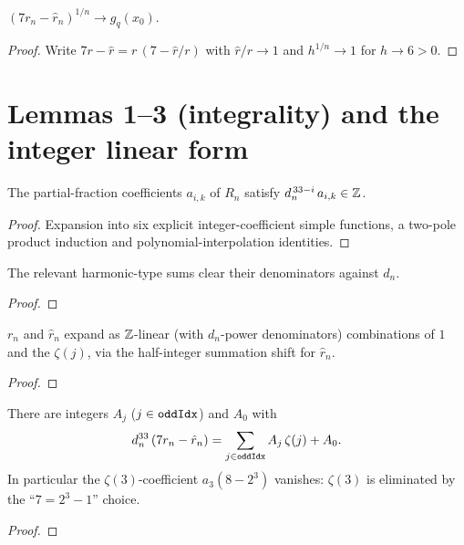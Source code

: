 \begin{lemma}
  \label{lem:seven_root}
  \leanok
  $(7r_n-\hat r_n)^{1/n}\to g_q(x_0)$.
\end{lemma}
\begin{proof}\leanok{}
  Write $7r-\hat r=r\,(7-\hat r/r)$ with $\hat r/r\to1$ and $h^{1/n}\to1$ for
  $h\to6>0$.
\end{proof}

\chapter{Lemmas 1--3 (integrality) and the integer linear form}

\begin{lemma}
  \label{lem:lemma1}
  \leanok
  The partial-fraction coefficients $a_{i,k}$ of $R_n$ satisfy
  $d_n^{\,33-i}\,a_{i,k}\in\mathbb{Z}$.
\end{lemma}
\begin{proof}\leanok
  Expansion into six explicit integer-coefficient simple functions, a two-pole
  product induction and polynomial-interpolation identities.
\end{proof}

\begin{lemma}
  \label{lem:harmonic}
  \leanok
  The relevant harmonic-type sums clear their denominators against $d_n$.
\end{lemma}
\begin{proof}\leanok\end{proof}

\begin{lemma}
  \label{lem:lemma3}
  \leanok
  $r_n$ and $\hat r_n$ expand as $\mathbb{Z}$-linear (with $d_n$-power denominators)
  combinations of $1$ and the $\zeta(j)$, via the half-integer summation shift
  for $\hat r_n$.
\end{lemma}
\begin{proof}\leanok{}\end{proof}

\begin{theorem}
  \label{thm:elim}
  \leanok
  There are integers $A_j$ ($j\in\texttt{oddIdx}$) and $A_0$ with
  \[
    d_n^{33}\,(7r_n-\hat r_n)=\sum_{j\in\texttt{oddIdx}}A_j\,\zeta(j)+A_0 .
  \]
  In particular the $\zeta(3)$-coefficient $a_3(8-2^3)$ vanishes: $\zeta(3)$ is
  eliminated by the ``$7=2^3-1$'' choice.
\end{theorem}
\begin{proof}\leanok{}\end{proof}

